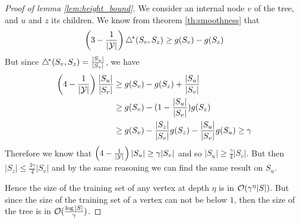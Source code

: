 \begin{proof}[Proof of lemma \ref{lem:height_bound}]
    We consider an internal node $v$ of the tree, and $u$ and $z$ its children. We know from theorem \ref{th:smoothness} that
    \begin{equation*}
        \left(3 - \frac{1}{|\mathcal{Y}|}\right) \triangle^{\!*}(S_v, S_z) \geq g(S_v) - g(S_z)
    \end{equation*}
    But since $\triangle^{\!*}(S_v, S_z) = \frac{|S_u|}{|S_v|}$, we have
    \begin{align*}
        \left(4 - \frac{1}{|\mathcal{Y}|}\right) \frac{|S_u|}{|S_v|} &\geq g(S_v) - g(S_z) + \frac{|S_u|}{|S_v|}\\
        & \geq g(S_v) - (1 - \frac{|S_u|}{|S_v|})g(S_z)\\
        & \geq g(S_v) - \frac{|S_z|}{|S_v|}g(S_z) - \frac{|S_u|}{|S_v|}g(S_u) \geq \gamma\\
    \end{align*}
    Therefore we know that $\left(4 - \frac{1}{|\mathcal{Y}|}\right)|S_u| \geq \gamma |S_v|$ and so $|S_u| \geq \frac{\gamma}{4} |S_v|$. But then $|S_z|\leq \frac{3\gamma}{4} |S_v|$ and by the same reasoning we can find the same result on $S_u$.

    Hence the size of the training set of any vertex at depth $\eta$ is in $\mathcal{O}(\gamma^\eta |S|)$. But since the size of the training set of a vertex can not be below $1$, then the size of the tree is in $\mathcal{O}(\frac{\log |S|}{\gamma})$.
\end{proof}

